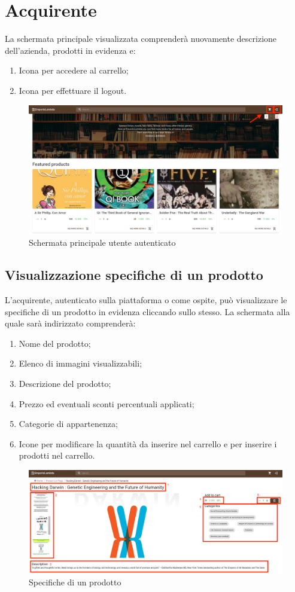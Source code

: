 \section{Acquirente}\label{Acquirente}
La schermata principale visualizzata comprenderà nuovamente descrizione dell'azienda, prodotti in evidenza e:
\begin{enumerate}
	\item Icona per accedere al carrello;
	\item Icona per effettuare il logout. 
\end{enumerate} 
\begin{figure}[H]
	\centering
	\includegraphics[scale=0.25]{Immagini/Acquirente/home.customer.png}
	\caption{Schermata principale utente autenticato}
	\label{fig:Homecustomer}
\end{figure}
\subsection{Visualizzazione specifiche di un prodotto}
L'acquirente, autenticato sulla piattaforma o come ospite, può visualizzare le specifiche di un prodotto in evidenza cliccando sullo stesso. La schermata alla quale sarà indirizzato comprenderà:
\begin{enumerate}
	\item Nome del prodotto;
	\item Elenco di immagini visualizzabili;
	\item Descrizione del prodotto;
	\item Prezzo ed eventuali sconti percentuali applicati;
	\item Categorie di appartenenza;
	\item Icone per modificare la quantità da inserire nel carrello e per inserire i prodotti nel carrello.
\end{enumerate} 
\begin{figure}[H]
	\centering
	\includegraphics[scale=0.25]{Immagini/Acquirente/pdp.customer.png}
	\caption{Specifiche di un prodotto}
	\label{fig:SpecificheProdotto}
\end{figure}

